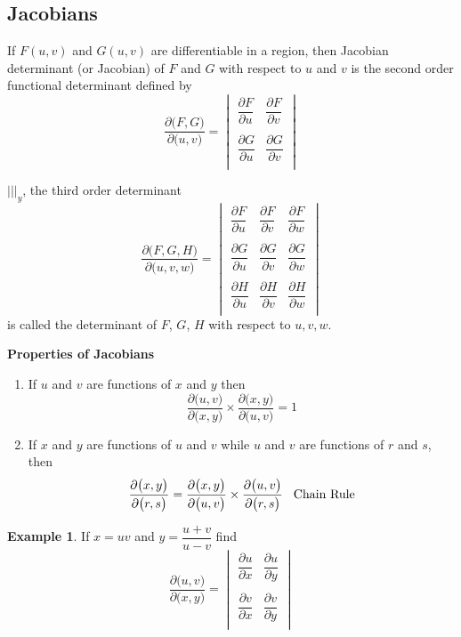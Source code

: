 \documentclass[11pt,a4paper]{article}
\theoremstyle{definition}
\newtheorem{exa}[thm]{Example}
\newcommand{\subhead}[1]{%
  \par\medskip\noindent\textbf{#1}\par\nobreak\smallskip}
\begin{document}
{\color[wave]{485}\subsection{Jacobians}}
If $F(u,v)$ and $G(u,v)$ are differentiable in a region, then Jacobian determinant (or Jacobian) of $F$ and $G$ with respect to $u$ and $v$ is the second order functional determinant defined by 
$$ \frac{\partial \big(F,G\big)}{\partial\big(u,v\big)} =
\begin{vmatrix}
\dfrac{\partial F}{\partial u} & \dfrac{\partial F}{\partial v}\\\\
\dfrac{\partial G}{\partial u} & \dfrac{\partial G}{\partial v}\\
\end{vmatrix}
$$

$|||_y$, the third order determinant
$$  \frac{\partial \big(F,G, H\big)}{\partial\big(u,v,w\big)} =
\begin{vmatrix}
\dfrac{\partial F}{\partial u} & \dfrac{\partial F}{\partial v} &  \dfrac{\partial F}{\partial w}\\\\
\dfrac{\partial G}{\partial u} & \dfrac{\partial G}{\partial v} &  \dfrac{\partial G}{\partial w}\\\\
\dfrac{\partial H}{\partial u} & \dfrac{\partial H}{\partial v} &  \dfrac{\partial H}{\partial w}\\
\end{vmatrix}
$$
is called the determinant of $F$, $G$, $H$ with respect to $u,v,w$.


\subhead{Properties of Jacobians}
\begin{enumerate}
\item If $u$ and $v$ are functions of $x$ and $y$ then $$\frac{\partial \big(u,v\big)}{\partial\big(x,y\big)}\times \frac{\partial \big(x,y\big)}{\partial\big(u,v\big)}=1$$
\item If $x$ and $y$ are functions of $u$ and $v$ while $u$ and $v$ are functions of $r$ and $s$, then $$\frac{\partial \big(x,y\big)}{\partial\big(r,s\big)} = \frac{\partial \big(x,y\big)}{\partial \big(u,v\big)}\times \frac{\partial\big(u,v\big)}{\partial \big(r,s\big)}\hspace{0.3cm}\text{Chain Rule}$$
\end{enumerate}

\begin{exa}
If $x = uv$ and $y =\dfrac{u + v}{u -v}$ find $$\frac{\partial \big(u,v\big)}{\partial\big(x,y\big)}=
\begin{vmatrix}
\dfrac{\partial u}{\partial x} & \dfrac{\partial u}{\partial y}\\\\
\dfrac{\partial v}{\partial x} & \dfrac{\partial v}{\partial y}\\
\end{vmatrix}
$$
\end{exa}
\end{document}

